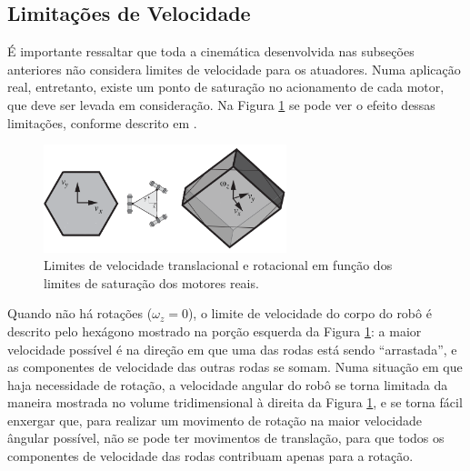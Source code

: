 
\subsection{Limitações de Velocidade}

É importante ressaltar que toda a cinemática desenvolvida nas subseções anteriores não considera limites de velocidade para os atuadores. Numa aplicação real, entretanto, existe um ponto de saturação no acionamento de cada motor, que deve ser levada em consideração. Na Figura \ref{fig:twist_sat} se pode ver o efeito dessas limitações, conforme descrito em \citet{lynch2017modern}.

\begin{figure}[h]
  \centering
  \includegraphics[width = 0.63\textwidth]{imagens/twist_sat}
  \caption{Limites de velocidade translacional e rotacional em função dos limites de saturação dos motores reais.}
  \label{fig:twist_sat}
\end{figure}

Quando não há rotações ($\omega_z = 0$), o limite de velocidade do corpo do robô é descrito pelo hexágono mostrado na porção esquerda da Figura \ref{fig:twist_sat}: a maior velocidade possível é na direção em que uma das rodas está sendo ``arrastada'', e as componentes de velocidade das outras rodas se somam. Numa situação em que haja necessidade de rotação, a velocidade angular do robô se torna limitada da maneira mostrada no volume tridimensional à direita da Figura \ref{fig:twist_sat}, e se torna fácil enxergar que, para realizar um movimento de rotação na maior velocidade ângular possível, não se pode ter movimentos de translação, para que todos os componentes de velocidade das rodas contribuam apenas para a rotação.

